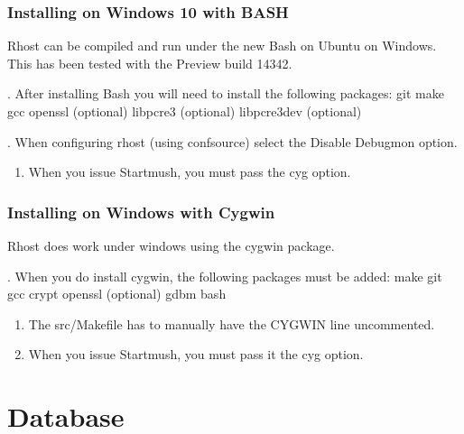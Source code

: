 \documentclass[letterpaper,10pt,english]{sphinxmanual}
\begin{document}
\subsubsection{Installing on Windows 10 with BASH}
\label{\detokenize{installation:installing-on-windows-10-with-bash}}
\sphinxAtStartPar
Rhost can be compiled and run under the new Bash on Ubuntu on Windows.
This has been tested with the Preview build 14342.

. After installing Bash you will need to install the following packages:
git
make
gcc
openssl (optional)
libpcre3 (optional)
libpcre3\sphinxhyphen{}dev (optional)

. When configuring rhost (using confsource) select the Disable Debugmon
option.
\begin{enumerate}
%
\setcounter{enumi}{2}
\item {} 
\sphinxAtStartPar
When you issue Startmush, you must pass the \sphinxhyphen{}cyg option.

\end{enumerate}


\subsubsection{Installing on Windows with Cygwin}
\label{\detokenize{installation:installing-on-windows-with-cygwin}}
\sphinxAtStartPar
Rhost does work under windows using the cygwin package.

.  When you do install cygwin, the following packages must be added:
make
git
gcc
crypt
openssl (optional)
gdbm
bash
\begin{enumerate}
%
\setcounter{enumi}{1}
\item {} 
\sphinxAtStartPar
The src/Makefile has to manually have the CYGWIN line uncommented.

\item {} 
\sphinxAtStartPar
When you issue Startmush, you must pass it the \sphinxhyphen{}cyg option.

\end{enumerate}


\section{Database}
\label{\detokenize{database:database}}\label{\detokenize{database::doc}}
\end{document}
